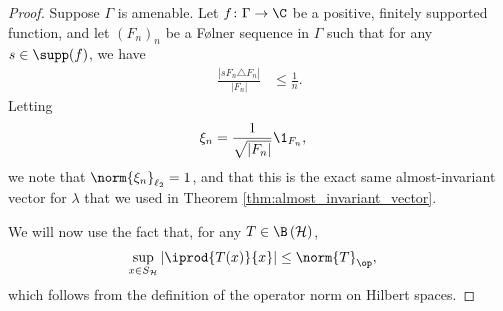 \begin{proof}
  Suppose $\Gamma$ is amenable. Let $f\colon \Gamma\rightarrow \C$ be a positive, finitely supported function, and let $\left( F_n \right)_n$ be a Følner sequence in $\Gamma$ such that for any $s\in \supp(f)$, we have
  \begin{align*}
    \frac{\left\vert sF_n \triangle F_n\right\vert}{\left\vert F_n \right\vert} &\leq \frac{1}{n}.
  \end{align*}
  Letting
  \begin{align*}
    \xi_n &= \frac{1}{\sqrt{\left\vert F_n \right\vert}}\1_{F_n},
  \end{align*}
  we note that $\norm{\xi_n}_{\ell_2} = 1$, and that this is the exact same almost-invariant vector for $\lambda$ that we used in Theorem \ref{thm:almost_invariant_vector}.\newline

  We will now use the fact that, for any $T\in \B\left( \mathcal{H} \right)$,
  \begin{align*}
    \sup_{x\in S_{\mathcal{H}}}\left\vert \iprod{T(x)}{x} \right\vert &\leq \norm{T}_{\op},
  \end{align*}
  which follows from the definition of the operator norm on Hilbert spaces.\newline


\end{proof}
